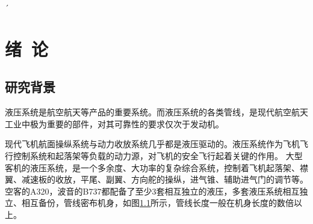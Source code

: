 ´%



\chapter{绪~论}
\label{chap:introduintroduction}
\section{研究背景}



液压系统是航空航天等产品的重要系统。而液压系统的各类管线，是现代航空航天工业中极为重要的部件，对其可靠性的要求仅次于发动机。

现代飞机航面操纵系统与动力收放系统几乎都是液压驱动的。液压系统作为飞机飞行控制系统和起落架等负载的动力源，对飞机的安全飞行起着关键的作用。
大型客机的液压系统，是一个多余度、大功率的复杂综合系统，控制着飞机起落架、襟翼、减速板的收放，平尾、副翼、方向舵的操纵，进气锥、辅助进气门的调节等\cite{dingfei2010}。空客的A320，波音的B737都配备了至少3套相互独立的液压\cite{dingfei2010}，多套液压系统相互独立、相互备份，管线密布机身，如图\ref{fig:plane-hose}所示，管线长度一般在机身长度的数倍以上。


\begin{figure}[!htbp]
	\centering
	\hspace{1cm}
	\label{fig:plane-hose}
\end{figure}



